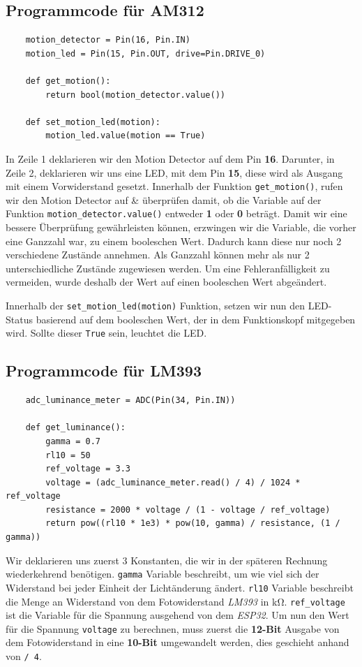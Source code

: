 \documentclass[9pt,a4paper]{report}
\begin{document}
	\subsection{Programmcode für AM312}
	\begin{lstlisting}
	motion_detector = Pin(16, Pin.IN)
	motion_led = Pin(15, Pin.OUT, drive=Pin.DRIVE_0)
	
	def get_motion():
		return bool(motion_detector.value())
		
	def set_motion_led(motion):
		motion_led.value(motion == True)
	\end{lstlisting}
	In Zeile 1 deklarieren wir den Motion Detector auf dem Pin \textbf{16}. Darunter, in Zeile 2, deklarieren wir uns eine LED, mit dem Pin \textbf{15}, diese wird als Ausgang mit einem Vorwiderstand gesetzt.
	Innerhalb der Funktion \texttt{get\_motion()}, rufen wir den Motion Detector auf \& überprüfen damit, ob die Variable auf der Funktion \texttt{motion\_detector.value()} entweder \textbf{1} oder \textbf{0} beträgt. Damit wir eine bessere Überprüfung gewährleisten können, erzwingen wir die Variable, die vorher eine Ganzzahl war, zu einem booleschen Wert. Dadurch kann diese nur noch 2 verschiedene Zustände annehmen. Als Ganzzahl können mehr als nur 2 unterschiedliche Zustände zugewiesen werden. Um eine Fehleranfälligkeit zu vermeiden, wurde deshalb der Wert auf einen booleschen Wert abgeändert.
	
	Innerhalb der \texttt{set\_motion\_led(motion)} Funktion, setzen wir nun den LED-Status basierend auf dem booleschen Wert, der in dem Funktionskopf mitgegeben wird. Sollte dieser \texttt{True} sein, leuchtet die LED.
	\subsection{Programmcode für LM393}
	\begin{lstlisting}
	adc_luminance_meter = ADC(Pin(34, Pin.IN))
	
	def get_luminance():
		gamma = 0.7
		rl10 = 50
		ref_voltage = 3.3
		voltage = (adc_luminance_meter.read() / 4) / 1024 * ref_voltage
		resistance = 2000 * voltage / (1 - voltage / ref_voltage)
		return pow((rl10 * 1e3) * pow(10, gamma) / resistance, (1 / gamma))
	\end{lstlisting}
	Wir deklarieren uns zuerst 3 Konstanten, die wir in der späteren Rechnung wiederkehrend benötigen.
	\texttt{gamma} Variable beschreibt, um wie viel sich der Widerstand bei jeder Einheit der Lichtänderung ändert. \texttt{rl10} Variable beschreibt die Menge an Widerstand von dem Fotowiderstand \textit{LM393} in kΩ. 
	\texttt{ref\_voltage} ist die Variable für die Spannung ausgehend von dem \textit{ESP32}.
	\newline
	\newline
	Um nun den Wert für die Spannung \texttt{voltage} zu berechnen, muss zuerst die \textbf{12-Bit} Ausgabe von dem Fotowiderstand in eine \textbf{10-Bit} umgewandelt werden, dies geschieht anhand von \texttt{/ 4}.
	
\end{document}

